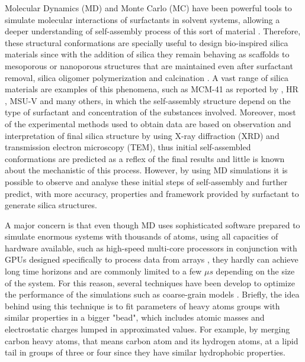 \documentclass[10pt,a4paper,twoside]{article}
\begin{document}
Molecular Dynamics (MD) and Monte Carlo (MC) have been powerful tools to simulate molecular interactions of surfactants in solvent systems, allowing a deeper understanding of self-assembly process of this sort of material \cite{someone}. Therefore, these structural conformations are specially useful to design bio-inspired silica materials \cite{bioinsp} since with the addition of silica they remain behaving as scaffolds to mesoporous or nanoporous structures that are maintained even after surfactant removal, silica oligomer polymerization and calcination \cite{silica1}.
A vast range of silica materials are examples of this phenomena, such as MCM-41 as reported by , HR \cite{hrib}, MSU-V \cite{msuv} and many others, in which the self-assembly structure depend on the type of surfactant and concentration of the substances involved. Moreover, most of the experimental methods used to obtain data are based on observation and interpretation of final silica structure by using X-ray diffraction (XRD) and transmission electron microscopy (TEM), thus initial self-assembled conformations are predicted as a reflex of the final results and little is known about the mechanistic of this process. However, by using MD simulations it is possible to observe and analyse these initial steps of self-assembly and further predict, with more accuracy, properties and framework provided by surfactant \cite{lipid} to generate silica structures.

A major concern is that even though MD uses sophisticated software prepared to simulate enormous systems with thousands of atoms, using all capacities of hardware available, such as high-speed multi-core processors in conjunction with GPUs designed specifically to process data from arrays \cite{gromacs}, they hardly can achieve long time horizons and are commonly limited to a few $\mu s$ depending on the size of the system. For this reason, several techniques have been develop to optimize the performance of the simulations such as coarse-grain models \cite{someone}. Briefly, the idea behind using this technique is to fit parameters of heavy atoms groups with similar properties in a bigger "bead", which includes atomic masses and electrostatic charges lumped in approximated values. For example, by merging carbon heavy atoms, that means carbon atom and its hydrogen atoms, at a lipid tail in groups of three or four since they have similar hydrophobic properties. 
\end{document}
